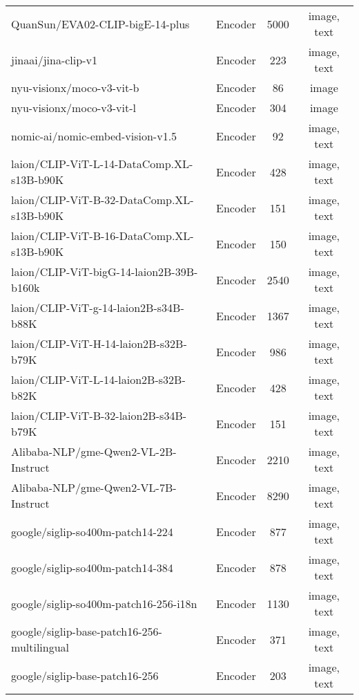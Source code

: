 \begin{table*}
{\begin{tabular}{lccc}
QuanSun/EVA02-CLIP-bigE-14-plus \cite{sun2023eva} & Encoder & 5000 & image, text \\ 
jinaai/jina-clip-v1 \cite{koukounas2024jina} & Encoder & 223 & image, text \\ 
nyu-visionx/moco-v3-vit-b \cite{chen2021empirical} & Encoder & 86 & image \\ 
nyu-visionx/moco-v3-vit-l \cite{chen2021empirical} & Encoder & 304 & image \\ 
nomic-ai/nomic-embed-vision-v1.5 \cite{nussbaum2024nomic, nomicembedv2024nomic} & Encoder & 92 & image, text \\ 
laion/CLIP-ViT-L-14-DataComp.XL-s13B-b90K \cite{gadre2024datacomp} & Encoder & 428 & image, text \\ 
laion/CLIP-ViT-B-32-DataComp.XL-s13B-b90K \cite{gadre2024datacomp} & Encoder & 151 & image, text \\ 
laion/CLIP-ViT-B-16-DataComp.XL-s13B-b90K \cite{gadre2024datacomp} & Encoder & 150 & image, text \\ 
laion/CLIP-ViT-bigG-14-laion2B-39B-b160k \cite{cherti2023reproducible} & Encoder & 2540 & image, text \\ 
laion/CLIP-ViT-g-14-laion2B-s34B-b88K \cite{cherti2023reproducible} & Encoder & 1367 & image, text \\ 
laion/CLIP-ViT-H-14-laion2B-s32B-b79K \cite{cherti2023reproducible} & Encoder & 986 & image, text \\ 
laion/CLIP-ViT-L-14-laion2B-s32B-b82K \cite{cherti2023reproducible} & Encoder & 428 & image, text \\ 
laion/CLIP-ViT-B-32-laion2B-s34B-b79K \cite{cherti2023reproducible} & Encoder & 151 & image, text \\ 
Alibaba-NLP/gme-Qwen2-VL-2B-Instruct \cite{zhang2024gme} & Encoder & 2210 & image, text \\ 
Alibaba-NLP/gme-Qwen2-VL-7B-Instruct \cite{zhang2024gme} & Encoder & 8290 & image, text \\ 
google/siglip-so400m-patch14-224 \cite{zhai2023sigmoid} & Encoder & 877 & image, text \\ 
google/siglip-so400m-patch14-384 \cite{zhai2023sigmoid} & Encoder & 878 & image, text \\ 
google/siglip-so400m-patch16-256-i18n \cite{zhai2023sigmoid} & Encoder & 1130 & image, text \\ 
google/siglip-base-patch16-256-multilingual \cite{zhai2023sigmoid} & Encoder & 371 & image, text \\ 
google/siglip-base-patch16-256 \cite{zhai2023sigmoid} & Encoder & 203 & image, text \\ 

\end{tabular}}
\end{table*}
